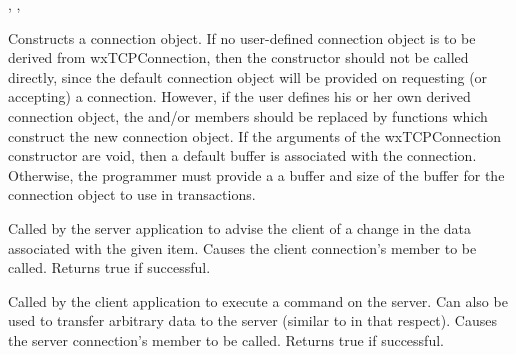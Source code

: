 
, , 


\label{wxtcpconnectionctor}



Constructs a connection object. If no user-defined connection object is
to be derived from wxTCPConnection, then the constructor should not be
called directly, since the default connection object will be provided on
requesting (or accepting) a connection. However, if the user defines his
or her own derived connection object, the \rtfsp
and/or  members should be replaced by
functions which construct the new connection object. If the arguments of
the wxTCPConnection constructor are void, then a default buffer is
associated with the connection. Otherwise, the programmer must provide a
a buffer and size of the buffer for the connection object to use in
transactions.

\label{wxtcpconnectionadvise}


Called by the server application to advise the client of a change in
the data associated with the given item. Causes the client
connection's  
member to be called. Returns true if successful.

\label{wxtcpconnectionexecute}


Called by the client application to execute a command on the server. Can
also be used to transfer arbitrary data to the server (similar
to  in that respect). Causes the
server connection's  member to be
called. Returns true if successful.

